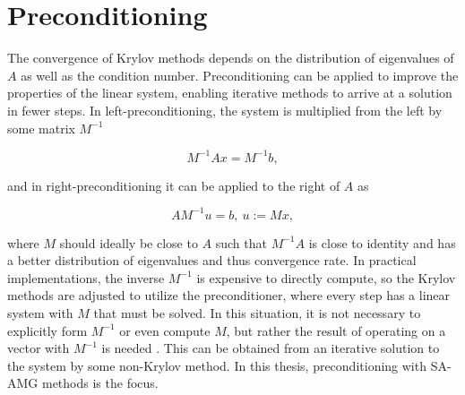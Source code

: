 
\section{Preconditioning}

The convergence of Krylov methods depends on the distribution of eigenvalues of $A$ as well as the condition number. Preconditioning can be applied to improve the properties of the linear system, enabling iterative methods to arrive at a solution in fewer steps. In left-preconditioning, the system is multiplied from the left by some matrix $M^{-1}$

\begin{equation}
    M^{-1}Ax = M^{-1}b,
\end{equation}

and in right-preconditioning it can be applied to the right of $A$ as

\begin{equation}
    A M^{-1} u = b,\ u:= Mx,
\end{equation}

where $M$ should ideally be close to $A$ such that $M^{-1}A$ is close to identity and has a better distribution of eigenvalues and thus convergence rate. In practical implementations, the inverse $M^{-1}$ is expensive to directly compute, so the Krylov methods are adjusted to utilize the preconditioner, where every step has a linear system with $M$ that must be solved. In this situation, it is not necessary to explicitly form $M^{-1}$ or even compute $M$, but rather the result of operating on a vector with $M^{-1}$ is needed \cite{Shewchuk1994}. This can be obtained from an iterative solution to the system by some non-Krylov method. In this thesis, preconditioning with SA-AMG methods is the focus.

